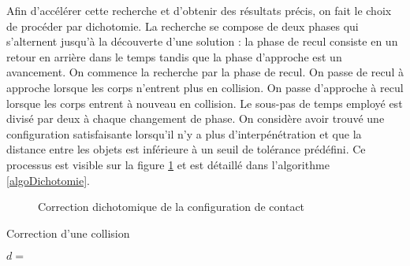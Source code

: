 Afin d'accélérer cette recherche et d'obtenir des résultats précis, on
fait le choix de procéder par dichotomie. La recherche se compose de
deux phases qui s'alternent jusqu'à la découverte d'une solution : la
phase de recul consiste en un retour en arrière dans le temps tandis
que la phase d'approche est un avancement. On commence la recherche
par la phase de recul. On passe de recul à approche lorsque les corps
n'entrent plus en collision. On passe d'approche à recul lorsque les
corps entrent à nouveau en collision. Le sous-pas de temps employé est
divisé par deux à chaque changement de phase. On considère avoir
trouvé une configuration satisfaisante lorsqu'il n'y a plus
d'interpénétration et que la distance entre les objets est inférieure
à un seuil de tolérance prédéfini. Ce processus est visible sur la
figure \ref{dichotomie} et est détaillé dans l'algorithme
\ref{algoDichotomie}.

\begin{figure}
  \centering
  
  \caption{Correction dichotomique de la configuration de contact}
  \label{dichotomie}
\end{figure}

\begin{algorithm}
  \caption{Correction d'une collision}
  \label{algoDichotomie}
  \dontprintsemicolon
  \BlankLine
  $d =$ \;
  \BlankLine
  \BlankLine
  \BlankLine
\end{algorithm}

